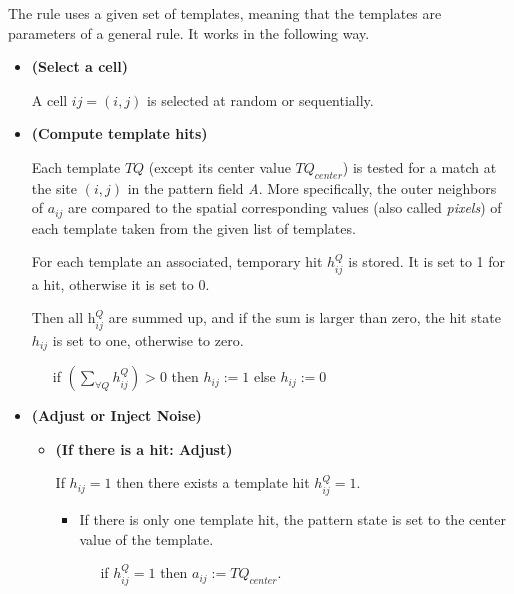 \documentclass[10pt,a4paper]{article}  %
\begin{document}
The rule uses a given set of templates, meaning that 
the templates are pa\-ra\-me\-ters of a general rule. 
It works in the following way.

\begin{itemize}
  \item \textbf{(Select a cell)}
  
  A cell $ij=(i,j)$ is selected at random or sequentially.
  
	\item \textbf{(Compute template hits)}
  
  Each template $\textit{TQ}$ (except its center value $\textit{TQ}_{center}$) is tested for 
  a match at the site $(i,j)$ in the pattern field \textit{A}. 
  More specifically, the outer neighbors of $a_{ij}$ are compared to the spatial corresponding values 
  (also called \textit{pixels}) of each template taken from the given list of templates. 
  
  For each template an associated, temporary hit $h^Q_{ij}$ is stored. It is set to 1 for a hit, otherwise it is set
  to 0. 
  
  Then all  $\textit{h}^Q_{ij}$ are summed up, and if the sum is larger than zero, the hit state $h_{ij}$ is set to one, otherwise to zero. 
  
  
  ~~~if  $(\sum_{\forall Q} h^Q_{ij} )>0$ then $h_{ij} := 1$ else  $h_{ij} := 0$ 
  
  \item \textbf{(Adjust or Inject Noise)}
  
    \begin{itemize}
      \item \textbf{(If there is a hit: Adjust)}
      
      If  $h_{ij}=1$ then there exists a template hit $h^Q_{ij} =1$.
      
            \begin{itemize}
              \item           
               If there is only one template hit, the pattern state is set to the center value of the template.
          
               ~~~if $h^Q_{ij} =1$ then $a_{ij}:=\textit{TQ}_{center}$.
            

\end{itemize}
\end{itemize}
\end{itemize}
\end{document}
